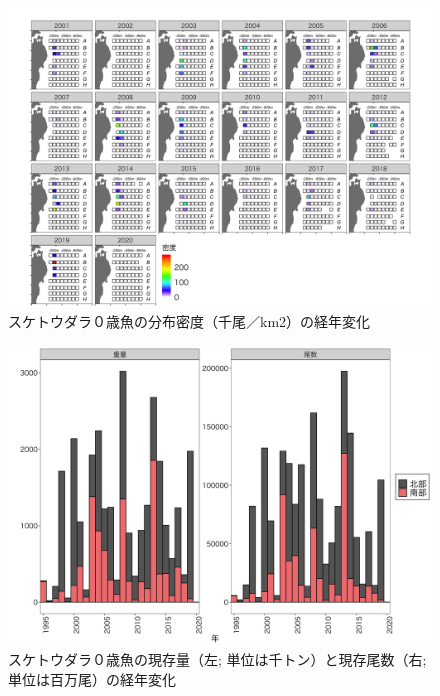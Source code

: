 \documentclass[11pt]{article} %
\begin{document}
\begin{linenumbers}
\begin{figure}[h]
  \centering
  \includegraphics[width = 14cm]{スケトウダラ０＋dens.png}
  \caption{スケトウダラ０歳魚の分布密度（千尾／km2）の経年変化}
\end{figure}

\begin{figure}[h]
  \centering
  \includegraphics[width = 14cm]{スケトウダラ０＋trend.png}
  \caption{スケトウダラ０歳魚の現存量（左; 単位は千トン）と現存尾数（右; 単位は百万尾）の経年変化}
\end{figure}


\end{linenumbers}
\end{document}
